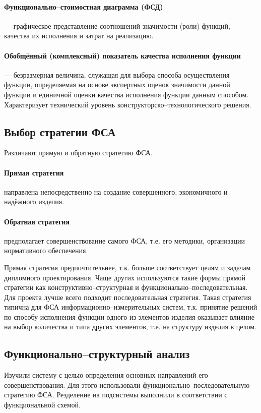 \paragraph{Функционально--стоимостная диаграмма (ФСД)}
--- графическое представление соотношений значимости (роли) функций, качества их
исполнения и затрат на реализацию.

\paragraph{Обобщённый (комплексный) показатель качества исполнения функции}
--- безразмерная величина, служащая для выбора способа осуществления функции,
определяемая на основе экспертных оценок значимости данной функции и единичной
оценки качества исполнения функции данным способом.
Характеризует технический уровень конструкторско--технологического решения.

\subsection{Выбор стратегии ФСА}
Различают прямую и обратную стратегию ФСА.

\paragraph{Прямая стратегия}
направлена непосредственно на создание совершенного, экономичного и надёжного
изделия.

\paragraph{Обратная стратегия}
предполагает совершенствование самого ФСА, т.е. его методики, организации
нормативного обеспечения.

Прямая стратегия предпочтительнее, т.к. больше соответствует целям и задачам
дипломного проектирования.
Чаще других используются такие формы прямой стратегии как
конструктивно--структурная и функционально--последовательная.
Для проекта лучше всего подходит последовательная стратегия.
Такая стратегия типична для ФСА информационно--измерительных систем, т.к.
принятие решений по способу исполнения функции одного из элементов изделия
оказывает влияние на выбор количества и типа других элементов, т.е. на структуру
изделия в целом.

\subsection{Функционально--структурный анализ}
Изучили систему с целью определения основных направлений его совершенствования.
Для этого использовали функционально--последовательную стратегию ФСА.
Резделение на подсистемы выполнили в соответствии с функциональной схемой.

